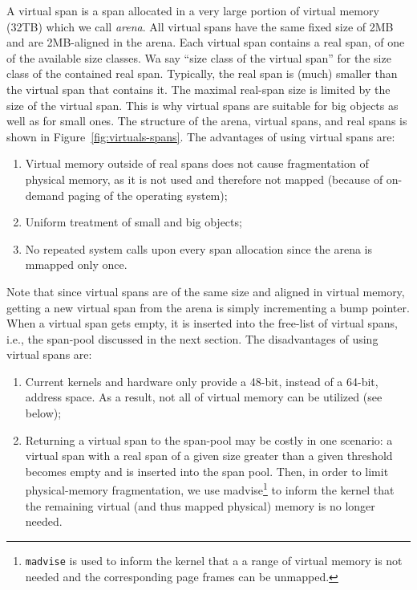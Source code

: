 \documentclass[10pt]{sigplanconf}
\newcommand{\impl}[1]{{\tt #1}\xspace}
\begin{document}
A virtual span is a span allocated in a very large portion of virtual memory
(32TB) which we call \emph{arena}. All virtual spans have the same fixed size of
2MB and are 2MB-aligned in the arena. Each virtual span contains a real span, of
one of the available size classes. Wa say ``size class of the virtual span'' for
the size class of the contained real span. Typically, the real span is (much)
smaller than the virtual span that contains it. The maximal real-span size is
limited by the size of the virtual span. This is why virtual spans are suitable
for big objects as well as for small ones. The structure of the arena, virtual
spans, and real spans is shown in Figure~\ref{fig:virtuals-spans}. The
advantages of using virtual spans are:

\begin{enumerate}[noitemsep]
  \item Virtual memory outside of real spans does not cause
    fragmentation of physical memory, as it is not used and therefore
    not mapped (because of on-demand paging of the operating system);
  \item Uniform treatment of small and big objects;
  \item No repeated system calls upon every span allocation since the arena
    is mmapped only once. 
\end{enumerate}

Note that since virtual spans are of the same size and aligned in virtual
memory, getting a new virtual span from the arena is simply incrementing a bump
pointer. When a virtual span gets empty, it is inserted into the free-list of
virtual spans, i.e., the span-pool discussed in the next section. The
disadvantages of using virtual spans are:
\begin{enumerate}[noitemsep]
  \item Current kernels and hardware only provide a 48-bit, instead of a 64-bit,
    address space.  As a result, not all of virtual memory can be utilized (see
    below);
  \item Returning a virtual span to the span-pool may be costly in one scenario: 
    a virtual span with a real span of a given size greater than a given
    threshold becomes empty and is inserted into the span pool. Then, in order
    to limit physical-memory fragmentation, we use madvise\footnote{
    \impl{madvise} is used to inform the kernel that a a range of
    virtual memory is not needed and the corresponding page frames can
    be unmapped.} to inform the kernel that the remaining virtual (and thus
    mapped physical) memory is no longer needed.
\end{enumerate}
\end{document}
